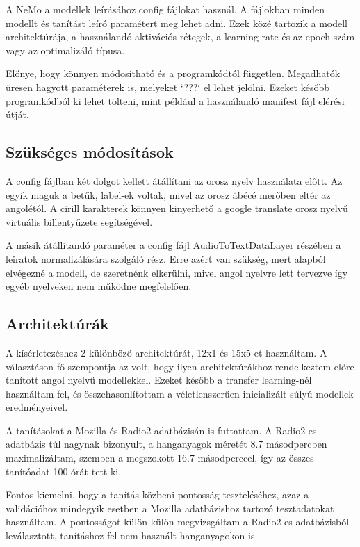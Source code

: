 A NeMo a modellek leírásához config fájlokat használ. A fájlokban minden modellt és tanítást leíró paramétert meg lehet adni. Ezek közé tartozik a modell architektúrája, a használandó aktivációs rétegek, a learning rate és az epoch szám vagy az optimalizáló típusa.

Előnye, hogy könnyen módosítható és a programkódtól független. Megadhatók üresen hagyott paraméterek is, melyeket `???` el lehet jelölni. Ezeket később programkódból ki lehet tölteni, mint például a használandó manifest fájl elérési útját.


\subsection{Szükséges módosítások}

A config fájlban két dolgot kellett átállítani az orosz nyelv használata előtt. Az egyik maguk a betűk, label-ek voltak, mivel az orosz ábécé merőben eltér az angolétól. A cirill karakterek könnyen kinyerhető a google translate orosz nyelvű virtuális billentyűzete segítségével.

A másik átállítandó paraméter a config fájl AudioToTextDataLayer részében a leiratok normalizálására szolgáló rész. Erre azért van szükség, mert alapból elvégezné a modell, de szeretnénk elkerülni, mivel angol nyelvre lett tervezve így egyéb nyelveken nem működne megfelelően. 


\subsection{Architektúrák}

A kísérletezéshez 2 különböző architektúrát, 12x1 és 15x5-et használtam. A választáson fő szempontja az volt, hogy ilyen architektúrákhoz rendelkeztem előre tanított angol nyelvű modellekkel. Ezeket később a transfer learning-nél használtam fel, és összehasonlítottam a véletlenszerűen inicializált súlyú modellek eredményeivel.

A tanításokat a Mozilla és Radio2 adatbázisán is futtattam. A Radio2-es adatbázis túl nagynak bizonyult, a hanganyagok méretét 8.7 másodpercben maximalizáltam, szemben a megszokott 16.7 másodperccel, így az összes tanítóadat 100 órát tett ki.


Fontos kiemelni, hogy a tanítás közbeni pontosság teszteléséhez, azaz a validációhoz mindegyik esetben a Mozilla adatbázishoz tartozó tesztadatokat használtam. A pontosságot külön-külön megvizsgáltam a Radio2-es adatbázisból leválasztott, tanításhoz fel nem használt hanganyagokon is.

